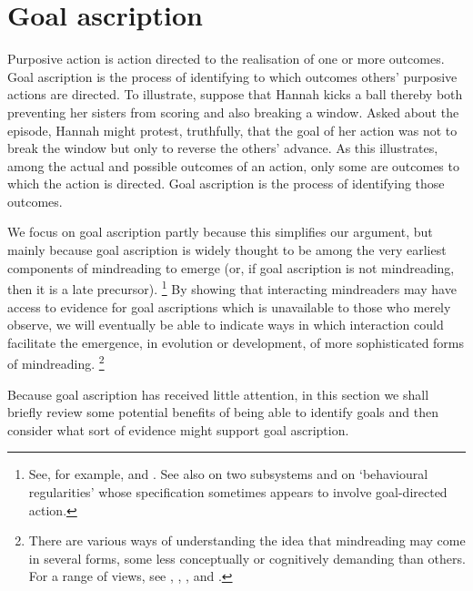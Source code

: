 \documentclass[12pt,a4paper]{extarticle}
\begin{document}
\section{Goal ascription}
Purposive action is action directed to the realisation of one or more outcomes.
Goal ascription is the process of identifying to which outcomes others' purposive actions are directed.
To illustrate, suppose that
Hannah kicks a ball thereby both preventing her sisters from scoring and also breaking a window.
Asked about the episode,
Hannah might protest, truthfully, that the goal of her action was not to break the window but only to reverse the others' advance.
As this illustrates,
among the actual and possible outcomes of an action,
only some are outcomes to which the action is directed.
Goal ascription is the process of identifying 
 those outcomes.

We focus on goal ascription 
partly because this simplifies our argument,
but mainly because goal ascription is widely thought to be among the very earliest components of mindreading to emerge (or, if goal ascription is not mindreading, then it is a late precursor).%
\footnote{
See, for example,
\citet{Gergely:1995sq} and 
\citet{Woodward:1998dm}.
See also
\citet[p.\ 111, Box 1]{Baillargeon:gx}
on two subsystems
and 
\citet{Povinelli:2001jf} on `behavioural regularities' whose specification sometimes appears to involve goal-directed action.
}
By showing that
  interacting mindreaders may have access to 
  evidence for goal ascriptions 
  which is unavailable to those who merely observe,
we will eventually be able to indicate ways in which interaction could facilitate the emergence, in evolution or development, of more sophisticated forms of mindreading.%
\footnote{
There are various ways of understanding the idea that mindreading may come in several forms, some less conceptually or cognitively demanding than others.
For a range of views, see
 \citet{Apperly:2009ju},
 \citet{Call:2005qe},
 \citet{Doherty:2006wz},
 \citet{ONeill:2005ff}
 and
 \citet{Wellman:2001if}.
}

Because goal ascription has received little attention,
in this section
we shall 
briefly review some potential benefits of being able to identify goals
and then 
consider what sort of evidence might support goal ascription.
\end{document}
